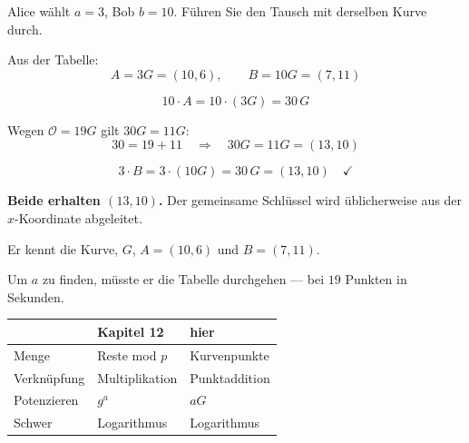 \begin{aufgabe}
Alice wählt $a = 3$, Bob $b = 10$. Führen Sie den Tausch mit derselben Kurve durch.

\loesung
{}
Aus der Tabelle:
\[ A = 3G = (10,6), \qquad B = 10G = (7,11) \]

\[ 10\cdot A = 10\cdot(3G) = 30\,G \]

Wegen $\mathcal{O} = 19G$ gilt $30G = 11G$:
\[ 30 = 19+11 \quad\Longrightarrow\quad 30G = 11G = (13,10) \]

\[ 3\cdot B = 3\cdot(10G) = 30\,G = (13,10) \quad \checkmark \]

\begin{center}
\begin{minipage}{0.9\textwidth}
\textbf{Beide erhalten $(13,10)$.} Der gemeinsame Schlüssel wird üblicherweise aus der $x$-Koordinate abgeleitet.
\end{minipage}
\end{center}

Er kennt die Kurve, $G$, $A = (10,6)$ und $B = (7,11)$.

Um $a$ zu finden, müsste er die Tabelle durchgehen --- bei $19$ Punkten in Sekunden.

\begin{center}
\begin{minipage}{0.88\textwidth}
\end{minipage}
\end{center}

\begin{center}
{\small
\renewcommand{\arraystretch}{1.48}
\begin{tabular}{@{}P{2.4cm}P{2.4cm}P{2.6cm}@{}}
\toprule
& \textbf{Kapitel 12} & \textbf{hier}\\
\midrule
Menge & Reste mod $p$ & Kurvenpunkte\\
Verknüpfung & Multiplikation & Punktaddition\\
Potenzieren & $g^{a}$ & $aG$\\
Schwer & Logarithmus & Logarithmus\\
\bottomrule
\end{tabular}}
\end{center}

\begin{center}
\begin{minipage}{0.88\textwidth}
\end{minipage}
\end{center}
\end{aufgabe}

